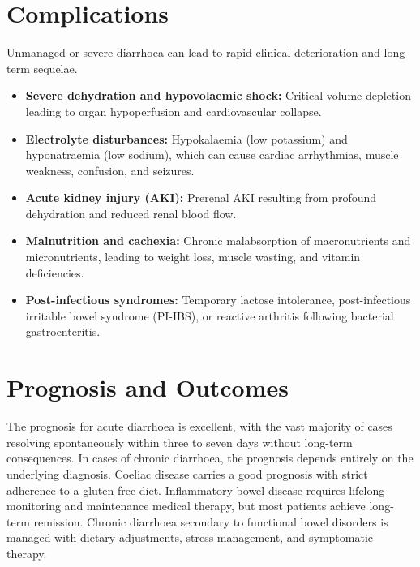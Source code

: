 \section*{Complications}
Unmanaged or severe diarrhoea can lead to rapid clinical deterioration and long-term sequelae.
\begin{itemize}
    \item \textbf{Severe dehydration and hypovolaemic shock:} Critical volume depletion leading to organ hypoperfusion and cardiovascular collapse.
    \item \textbf{Electrolyte disturbances:} Hypokalaemia (low potassium) and hyponatraemia (low sodium), which can cause cardiac arrhythmias, muscle weakness, confusion, and seizures.
    \item \textbf{Acute kidney injury (AKI):} Prerenal AKI resulting from profound dehydration and reduced renal blood flow.
    \item \textbf{Malnutrition and cachexia:} Chronic malabsorption of macronutrients and micronutrients, leading to weight loss, muscle wasting, and vitamin deficiencies.
    \item \textbf{Post-infectious syndromes:} Temporary lactose intolerance, post-infectious irritable bowel syndrome (PI-IBS), or reactive arthritis following bacterial gastroenteritis.
\end{itemize}

\section*{Prognosis and Outcomes}
The prognosis for acute diarrhoea is excellent, with the vast majority of cases resolving spontaneously within three to seven days without long-term consequences. In cases of chronic diarrhoea, the prognosis depends entirely on the underlying diagnosis. Coeliac disease carries a good prognosis with strict adherence to a gluten-free diet. Inflammatory bowel disease requires lifelong monitoring and maintenance medical therapy, but most patients achieve long-term remission. Chronic diarrhoea secondary to functional bowel disorders is managed with dietary adjustments, stress management, and symptomatic therapy.

